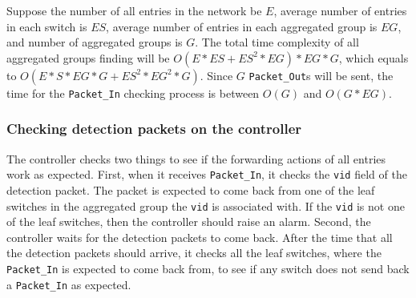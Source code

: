 \documentclass[conference]{IEEEtran}
\begin{document}
Suppose the number of all entries in the network be $E$, average number of entries in each switch is $ES$, average number of entries in each aggregated group is $EG$, and number of aggregated groups is $G$. The total time complexity of all aggregated groups finding will be $O(E*ES + ES^2*EG) * EG * G$, which equals to $O(E*S*EG*G + ES^2*EG^2*G)$. Since $G$ \texttt{Packet\_Out}s will be sent, the time for the \texttt{Packet\_In} checking process is between $O(G)$ and $O(G*EG)$.

\subsubsection{Checking detection packets on the controller}
The controller checks two things to see if the forwarding actions of all entries work as expected. First, when it receives \texttt{Packet\_In}, it checks the \texttt{vid} field of the detection packet. The packet is expected to come back from one of the leaf switches in the aggregated group the \texttt{vid} is associated with. If the \texttt{vid} is not one of the leaf switches, then the controller should raise an alarm. Second, the controller waits for the detection packets to come back. After the time that all the detection packets should arrive, it checks all the leaf switches, where the \texttt{Packet\_In} is expected to come back from, to see if any switch does not send back a \texttt{Packet\_In} as expected. 


\end{document}
